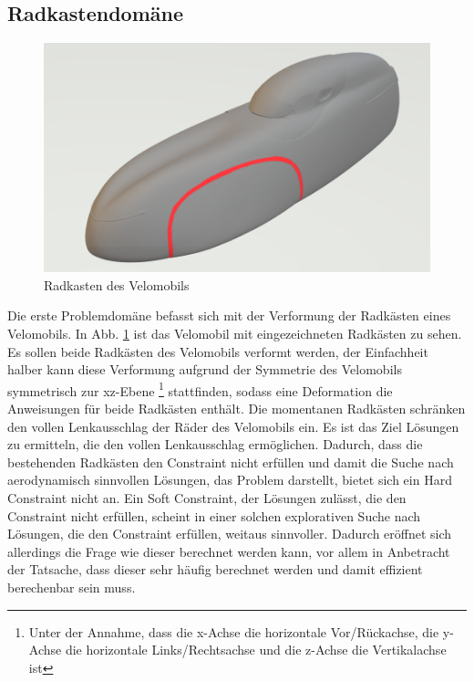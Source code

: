 \documentclass[12pt]{article}
\begin{document}
\subsection{Radkastendomäne}
\begin{figure}
	\includegraphics[width=\linewidth]{velo_wheelcase}
	\caption{Radkasten des Velomobils}
	\label{fig:wheelcase}
\end{figure}

Die erste Problemdomäne befasst sich mit der Verformung der Radkästen eines Velomobils.
In Abb. \ref{fig:wheelcase} ist das Velomobil mit eingezeichneten Radkästen zu sehen.
Es sollen beide Radkästen des Velomobils verformt werden, der Einfachheit halber kann diese Verformung aufgrund der Symmetrie des Velomobils symmetrisch zur xz-Ebene
\footnote{\label{foot:coords} Unter der Annahme, dass die x-Achse die horizontale Vor/Rückachse, die y-Achse die horizontale Links/Rechtsachse und die z-Achse die Vertikalachse ist} stattfinden, sodass eine Deformation die Anweisungen für beide Radkästen enthält.
Die momentanen Radkästen schränken den vollen Lenkausschlag der Räder des Velomobils ein.
Es ist das Ziel Lösungen zu ermitteln, die den vollen Lenkausschlag ermöglichen.
Dadurch, dass die bestehenden Radkästen den Constraint nicht erfüllen und damit die Suche nach aerodynamisch sinnvollen Lösungen, das Problem darstellt, bietet sich ein Hard Constraint nicht an.
Ein Soft Constraint, der Lösungen zulässt, die den Constraint nicht erfüllen, scheint in einer solchen explorativen Suche nach Lösungen, die den Constraint erfüllen, weitaus sinnvoller.
Dadurch eröffnet sich allerdings die Frage wie dieser berechnet werden kann, vor allem in Anbetracht der Tatsache, dass dieser sehr häufig berechnet werden und damit effizient berechenbar sein muss.
\end{document}

